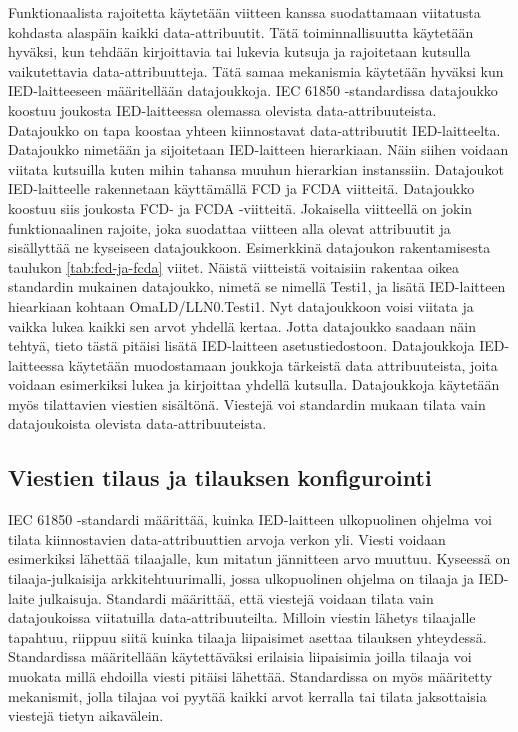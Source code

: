 Funktionaalista rajoitetta käytetään viitteen kanssa suodattamaan viitatusta kohdasta alaspäin kaikki data-attribuutit. Tätä toiminnallisuutta käytetään hyväksi, kun tehdään kirjoittavia tai lukevia kutsuja ja rajoitetaan kutsulla vaikutettavia data-attribuutteja. Tätä samaa mekanismia käytetään hyväksi kun IED-laitteeseen määritellään datajoukkoja. IEC 61850 -standardissa datajoukko koostuu joukosta IED-laitteessa olemassa olevista data-attribuuteista. Datajoukko on tapa koostaa yhteen kiinnostavat data-attribuutit IED-laitteelta. Datajoukko nimetään ja sijoitetaan IED-laitteen hierarkiaan. Näin siihen voidaan viitata kutsuilla kuten mihin tahansa muuhun hierarkian instanssiin. Datajoukot IED-laitteelle rakennetaan käyttämällä FCD ja FCDA viitteitä. Datajoukko koostuu siis joukosta FCD- ja FCDA -viitteitä. Jokaisella viitteellä on jokin funktionaalinen rajoite, joka suodattaa viitteen alla olevat attribuutit ja sisällyttää ne kyseiseen datajoukkoon. Esimerkkinä datajoukon rakentamisesta taulukon \ref{tab:fcd-ja-fcda} viitet. Näistä viitteistä voitaisiin rakentaa oikea standardin mukainen datajoukko, nimetä se nimellä Testi1, ja lisätä IED-laitteen hiearkiaan kohtaan OmaLD/LLN0.Testi1. Nyt datajoukkoon voisi viitata ja vaikka lukea kaikki sen arvot yhdellä kertaa. Jotta datajoukko saadaan näin tehtyä, tieto tästä pitäisi lisätä IED-laitteen asetustiedostoon. Datajoukkoja IED-laitteessa käytetään muodostamaan joukkoja tärkeistä data attribuuteista, joita voidaan esimerkiksi lukea ja kirjoittaa yhdellä kutsulla. Datajoukkoja käytetään myös tilattavien viestien sisältönä. Viestejä voi standardin mukaan tilata vain datajoukoista olevista data-attribuuteista. \mbox{\cite[s.~61--68]{IEC61850-7-2}}


\subsection{Viestien tilaus ja tilauksen konfigurointi}
\label{ch:viestien-tilaus-ja-tilauksen-konfigurointi}
IEC 61850 -standardi määrittää, kuinka IED-laitteen ulkopuolinen ohjelma voi tilata kiinnostavien data-attribuuttien arvoja verkon yli. Viesti voidaan esimerkiksi lähettää tilaajalle, kun mitatun jännitteen arvo muuttuu. Kyseessä on tilaaja-julkaisija arkkitehtuurimalli, jossa ulkopuolinen ohjelma on tilaaja ja IED-laite julkaisuja. Standardi määrittää, että viestejä voidaan tilata vain datajoukoissa viitatuilla data-attribuuteilta. Milloin viestin lähetys tilaajalle tapahtuu, riippuu siitä kuinka tilaaja liipaisimet asettaa tilauksen yhteydessä. Standardissa määritellään käytettäväksi erilaisia liipaisimia joilla tilaaja voi muokata millä ehdoilla viesti pitäisi lähettää. Standardissa on myös määritetty mekanismit, jolla tilajaa voi pyytää kaikki arvot kerralla tai tilata jaksottaisia viestejä tietyn aikavälein.

